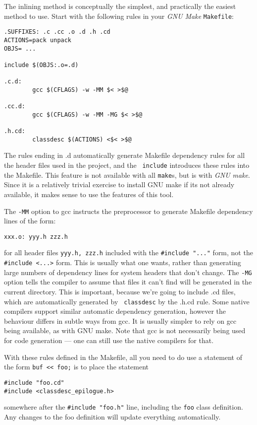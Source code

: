 
The inlining method is conceptually the simplest, and practically the
easiest method to use. Start with the following rules in your {\em GNU
  Make} {\tt Makefile}:
\begin{verbatim}
.SUFFIXES: .c .cc .o .d .h .cd
ACTIONS=pack unpack
OBJS= ...

include $(OBJS:.o=.d)

.c.d: 
        gcc $(CFLAGS) -w -MM $< >$@

.cc.d: 
        gcc $(CFLAGS) -w -MM -MG $< >$@

.h.cd:
        classdesc $(ACTIONS) <$< >$@

\end{verbatim} 

The rules ending in .d automatically generate Makefile dependency
rules for all the header files used in the project, and the {\tt
  include} introduces these rules into the Makefile. This feature is
not available with all {\tt make}s, but is with {\em GNU make}. Since
it is a relatively trivial exercise to install GNU make if its not
already available, it makes sense to use the features of this tool.

The {\tt -MM} option to gcc instructs the preprocessor to generate
Makefile dependency lines of the form:
\begin{verbatim}
xxx.o: yyy.h zzz.h
\end{verbatim}
for all header files {\tt yyy.h, zzz.h} included with the
\verb+#include "..."+ form, not the \verb+#include <...>+ form. This
is usually what one wants, rather than generating large numbers of
dependency lines for system headers that don't change. The {\tt -MG}
option tells the compiler to assume that files it can't find will be
generated in the current directory. This is important, because we're
going to include .cd files, which are automatically generated by {\tt
  classdesc} by the .h.cd rule.
Some native compilers support similar automatic dependency generation,
however the behaviour differs in subtle ways from gcc. It is usually
simpler to rely on gcc being available, as with GNU make. Note that
gcc is not necessarily being used for code generation --- one can
still use the native compilers for that.

With these rules defined in the Makefile, all you need to do use a
statement of the form \verb+buf << foo;+ is to place the statement 
\begin{verbatim}
#include "foo.cd"
#include <classdesc_epilogue.h>
\end{verbatim}
somewhere after the \verb+#include "foo.h"+ line, including the
{\tt foo} class definition. Any changes to the foo definition will
update everything automatically.

